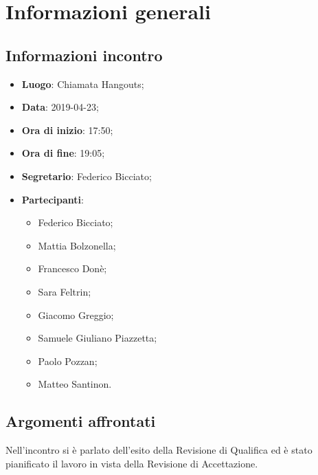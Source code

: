 \section{Informazioni generali}

\subsection{Informazioni incontro}
\begin{itemize}
\item \textbf{Luogo}: Chiamata Hangouts;
\item \textbf{Data}: 2019-04-23;
\item \textbf{Ora di inizio}: 17:50;
\item \textbf{Ora di fine}: 19:05;
\item \textbf{Segretario}: Federico Bicciato;
\item \textbf{Partecipanti}: 
\begin{itemize}
	\item Federico Bicciato;
	\item Mattia Bolzonella;
	\item Francesco Donè;
	\item Sara Feltrin;
	\item Giacomo Greggio;
	\item Samuele Giuliano Piazzetta;
	\item Paolo Pozzan;
	\item Matteo Santinon.
\end{itemize}
\end{itemize}

\subsection{Argomenti affrontati}
Nell'incontro si è parlato dell'esito della Revisione di 
Qualifica ed è stato pianificato il lavoro in vista della Revisione di 
Accettazione.
